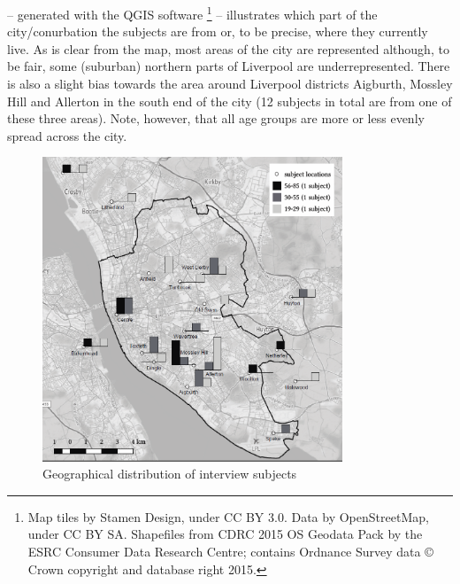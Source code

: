  -- generated with the QGIS software \parencite{QGIS2016}\footnote{Map tiles by Stamen Design, under CC BY 3.0. Data by OpenStreetMap, under CC BY SA. Shapefiles from CDRC 2015 OS Geodata Pack by the ESRC Consumer Data Research Centre; contains Ordnance Survey data © Crown copyright and database right 2015.} -- illustrates which part of the city/conurbation the subjects are from or, to be precise, where they currently live. As is clear from the map, most areas of the city are represented although, to be fair, some (suburban) northern parts of Liverpool are underrepresented. There is also a slight bias towards the area around Liverpool districts Aigburth, Mossley Hill and Allerton in the south end of the city (12 subjects in total are from one of these three areas). Note, however, that all age groups are more or less evenly spread across the city.

	\begin{figure}
		
 		\includegraphics[width=0.8\textwidth]{figures/liverpool-participant-map.png}
		\caption{Geographical distribution of interview subjects}\label{fig.map.participants}
	\end{figure}

